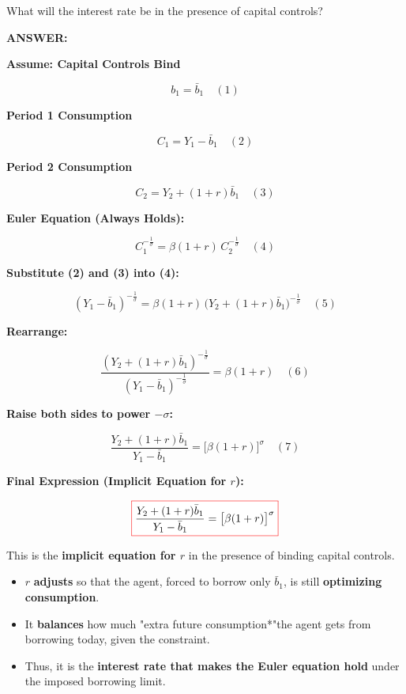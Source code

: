 \documentclass[12pt]{article}
\begin{document}
What will the interest rate be in the presence of capital controls?

\vspace{0.5em}
\noindent\textcolor{formalred}{\textbf{ANSWER:}}


\textbf{Assume: Capital Controls Bind}  

\[
b_1 = \bar{b}_1 \quad (1)
\]

\textbf{Period 1 Consumption}  

\[
C_1 = Y_1 - \bar{b}_1 \quad (2)
\]

\textbf{Period 2 Consumption}  

\[
C_2 = Y_2 + (1+r)\bar{b}_1 \quad (3)
\]

\textbf{Euler Equation (Always Holds):}  

\[
C_1^{-\tfrac{1}{\sigma}} = \beta(1+r) \, C_2^{-\tfrac{1}{\sigma}} \quad (4)
\]

\textbf{Substitute (2) and (3) into (4):}  

\[
(Y_1 - \bar{b}_1)^{-\tfrac{1}{\sigma}}
= \beta(1+r) \, \big(Y_2 + (1+r)\bar{b}_1\big)^{-\tfrac{1}{\sigma}} \quad (5)
\]

\textbf{Rearrange:}  

\[
\frac{(Y_2 + (1+r)\bar{b}_1)^{-\tfrac{1}{\sigma}}}{(Y_1 - \bar{b}_1)^{-\tfrac{1}{\sigma}}}
= \beta(1+r) \quad (6)
\]

\textbf{Raise both sides to power \( -\sigma \):}  

\[
\frac{Y_2 + (1+r)\bar{b}_1}{Y_1 - \bar{b}_1}
= \big[\beta(1+r)\big]^{\sigma} \quad (7)
\]

\textbf{Final Expression (Implicit Equation for \(r\)):}  

\[
\fcolorbox{red}{white}{$
\displaystyle 
\frac{Y_2 + (1+r)\bar{b}_1}{\,Y_1 - \bar{b}_1\,} = \big[\beta(1+r)\big]^{\sigma}
$}
\]

This is the \textbf{implicit equation for \(r\)} in the presence of binding capital controls.

\begin{itemize}
    \item \( r \) \textbf{adjusts} so that the agent, forced to borrow only \( \bar{b}_1 \), is still \textbf{optimizing consumption}.
    
    \item It \textbf{balances} how much "extra future consumption*"the agent gets from borrowing today, given the constraint.
    
    \item Thus, it is the \textbf{interest rate that makes the Euler equation hold} under the imposed borrowing limit.
\end{itemize}
\end{document}
